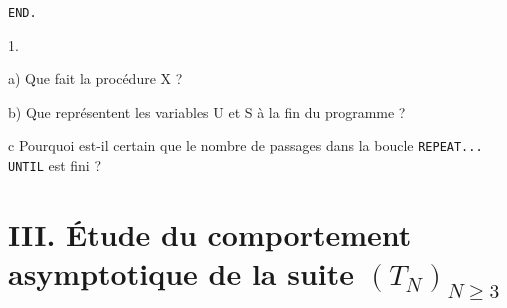 \documentclass[11pt]{article}%
\begin{document}
\texttt{END.}

\begin{noliste}{1.}
 \setlength{\itemsep}{4mm}
\item[a)] Que fait la procédure X ?

\item[b)] Que représentent les variables U et S à la fin du programme ?

\item[c] Pourquoi est-il certain que le nombre de passages dans la
boucle
\texttt{REPEAT... UNTIL} est fini ?
\end{noliste}

\section*{III. Étude du comportement asymptotique de la suite
$(T_{N})_{N\geq 3}$}
\end{document}
